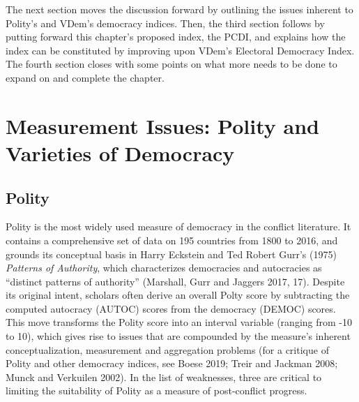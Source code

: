 \documentclass [11pt]{article}
\begin{document}
The next section moves the discussion forward by outlining the issues inherent to Polity's and VDem's democracy indices. Then, the third section follows by putting forward this chapter's proposed index, the PCDI, and explains how the index can be constituted by improving upon VDem's Electoral Democracy Index. The fourth section closes with some points on what more needs to be done to expand on and complete the chapter.


\section*{Measurement Issues: Polity and Varieties of Democracy}

 \subsection*{Polity}

Polity is the most widely used measure of democracy in the conflict literature. It contains a comprehensive set of data on 195 countries from 1800 to 2016, and grounds its conceptual basis in Harry Eckstein and Ted Robert Gurr's (1975) \emph{Patterns of Authority}, which characterizes democracies and autocracies as ``distinct patterns of authority'' (Marshall, Gurr and Jaggers 2017, 17). Despite its original intent, scholars often derive an overall Polty score by subtracting the computed autocracy (AUTOC) scores from the democracy (DEMOC) scores. This move transforms the Polity score into an interval variable (ranging from -10 to 10), which gives rise to issues that are compounded by the measure's inherent conceptualization, measurement and aggregation problems (for a critique of Polity and other democracy indices, see Boese 2019; Treir and Jackman 2008; Munck and Verkuilen 2002). In the list of weaknesses, three are critical to limiting the suitability of Polity as a measure of post-conflict progress.
\end{document}
